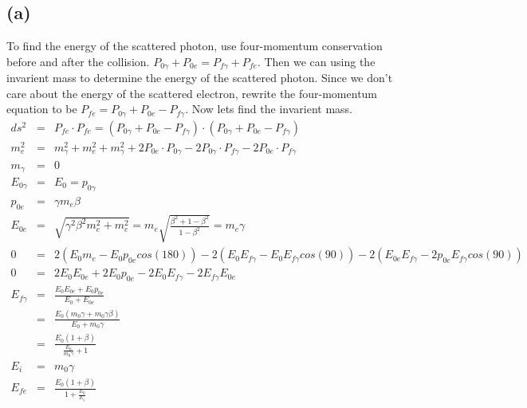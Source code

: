 \documentclass[11pt]{amsart}
\begin{document}
\subsection*{(a)} To find the energy of the scattered photon, use four-momentum conservation before and after the collision. $P_{0\gamma}+P_{0e}=P_{f\gamma}+P_{fe}$. Then we can using the invarient mass to determine the energy of the scattered photon. Since we don't care about the energy of the scattered electron, rewrite the four-momentum equation to be $P_{fe}=P_{0\gamma}+P_{0e}-P_{f\gamma}$. Now lets find the invarient mass. \\
\begin{eqnarray*}
ds^{2} &=& P_{fe}\cdot{P_{fe}} = (P_{0\gamma}+P_{0e}-P_{f\gamma})\cdot{(P_{0\gamma}+P_{0e}-P_{f\gamma})} \\
m_{e}^{2} &=& m_{\gamma}^{2}+m_{e}^{2}+m_{\gamma}^{2}+2P_{0e}\cdot{P_{0\gamma}}-2P_{0\gamma}\cdot{P_{f\gamma}} -2P_{0e}\cdot{P_{f\gamma}} \\
m_{\gamma} &=& 0 \\
E_{0\gamma} &=& E_{0} = p_{0\gamma} \\
p_{0e} &=& \gamma{m_{e}}\beta \\
E_{0e} &=& \sqrt{\gamma^{2}\beta^{2}m_{e}^{2}+m_{e}^{2}} = m_{e}\sqrt{\frac{\beta^{2}+1-\beta^{2}}{1-\beta^{2}}} = m_{e}\gamma \\
0 &=& 2(E_{0}m_{e}-E_{0}p_{0e}cos(180))-2(E_{0}E_{f\gamma}-E_{0}E_{f\gamma}cos(90))-2(E_{0e}E_{f\gamma}-2p_{0e}E_{f\gamma}cos(90)) \\
0 &=& 2E_{0}E_{0e}+2E_{0}p_{0e}-2E_{0}E_{f\gamma}-2E_{f\gamma}E_{0e} \\
E_{f\gamma} &=& \frac{E_{0}E_{0e}+E_{0}p_{0e}}{E_{0}+E_{0e}} \\
&=& \frac{E_{0}(m_{0}\gamma+m_{0}\gamma\beta)}{E_{0}+m_{0}\gamma} \\
&=& \frac{E_{0}(1+\beta)}{\frac{E_{0}}{m_{0}\gamma}+1} \\
E_{i} &=& m_{0}\gamma \\
E_{fe} &=& \frac{E_{0}(1+\beta)}{1+\frac{E_{0}}{E_{i}}} 
\end{eqnarray*} \\
\end{document}
